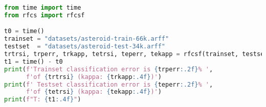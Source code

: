\begin{lstlisting}[language=Python, caption={Serial Cython implementation of the RF test case - Python main code.}]
from time import time
from rfcs import rfcsf

t0 = time()
trainset = "datasets/asteroid-train-66k.arff"
testset  = "datasets/asteroid-test-34k.arff"
trtrsi, trperr, trkapp, tetrsi, teperr, tekapp = rfcsf(trainset, testset)
t1 = time() - t0
print(f'Trainset classification error is {trperr:.2f}% ',
      f'of {trtrsi} (kappa: {trkapp:.4f})')
print(f' Testset classification error is {teperr:.2f}% ',
      f'of {tetrsi} (kappa: {tekapp:.4f})')
print(f"T: {t1:.4f}")
\end{lstlisting}




